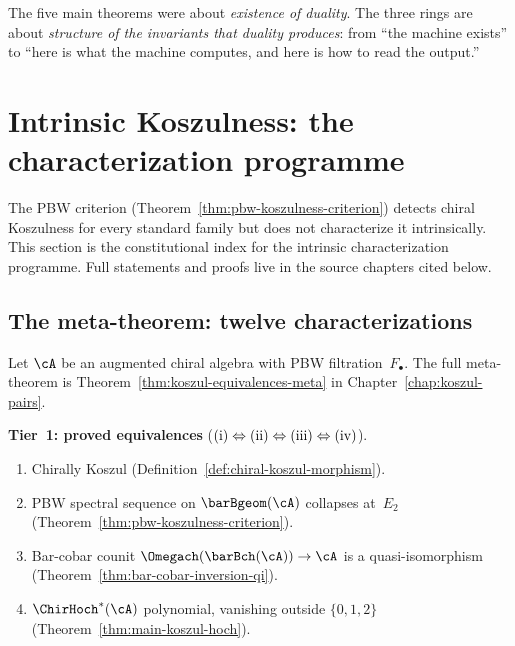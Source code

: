 The five main theorems were about \emph{existence of duality}.
The three rings are about \emph{structure of the invariants
that duality produces}: from ``the machine exists'' to ``here
is what the machine computes, and here is how to read the
output.''


\section{Intrinsic Koszulness: the characterization programme}
\label{sec:concordance-koszulness-programme}

The PBW criterion (Theorem~\ref{thm:pbw-koszulness-criterion})
detects chiral Koszulness for every standard family but does
not characterize it intrinsically.  This section is the
constitutional index for the intrinsic characterization
programme.  Full statements and proofs live in the source
chapters cited below.

\subsection{The meta-theorem: twelve characterizations}
\label{subsec:concordance-koszulness-meta-theorem}

Let $\cA$ be an augmented chiral algebra with PBW
filtration~$F_\bullet$.  The full meta-theorem is
Theorem~\ref{thm:koszul-equivalences-meta} in
Chapter~\ref{chap:koszul-pairs}.

\medskip\noindent
\textbf{Tier~1: proved equivalences}
($\textup{(i)} \Leftrightarrow \textup{(ii)}
\Leftrightarrow \textup{(iii)}
\Leftrightarrow \textup{(iv)}$).

\begin{enumerate}[label=\textup{(\roman*)},ref=\roman*]
\item\label{item:kp-def}
  Chirally Koszul (Definition~\ref{def:chiral-koszul-morphism}).
  \hfill \checkmark
\item\label{item:kp-pbw}
  PBW spectral sequence on $\barBgeom(\cA)$ collapses at~$E_2$
  (Theorem~\ref{thm:pbw-koszulness-criterion}).
  \hfill \checkmark
\item\label{item:kp-barcobar}
  Bar-cobar counit $\Omegach(\barBch(\cA)) \to \cA$ is a quasi-isomorphism
  (Theorem~\ref{thm:bar-cobar-inversion-qi}).
  \hfill \checkmark
\item\label{item:kp-hochschild}
  $\ChirHoch^*(\cA)$ polynomial, vanishing outside $\{0,1,2\}$
  (Theorem~\ref{thm:main-koszul-hoch}).
  \hfill \checkmark
\end{enumerate}

